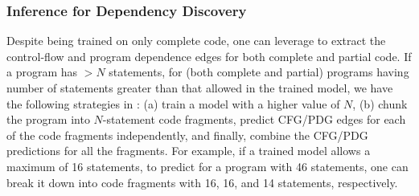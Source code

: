 
\subsubsection{\bf Inference for Dependency Discovery}
\label{sec:inference}
Despite being trained on only complete code, one can leverage \tool to extract the control-flow and program dependence edges for both complete and partial code.%
If a program has ${>}N$ statements, for (both complete and partial)
programs having number of statements greater than that allowed in the
trained \tool model, we have the following strategies in {\tool}: (a)
train a model with a higher value of $N$, (b) chunk the program into
$N$-statement code fragments, predict CFG/PDG edges for each of the
code fragments independently, and finally, combine the CFG/PDG
predictions for all the fragments. For example, if a trained model
allows a maximum of 16 statements, to predict for a program with 46
statements, one can break it down into code fragments with 16, 16, and
14 statements, respectively.


